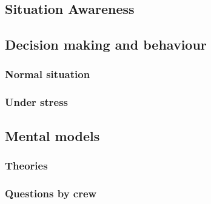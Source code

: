 \subsection{Situation Awareness}

\subsection{Decision making and behaviour}

\subsubsection{Normal situation}

\subsubsection{Under stress}

\subsection{Mental models}

\subsubsection{Theories}

\subsubsection{Questions by crew}